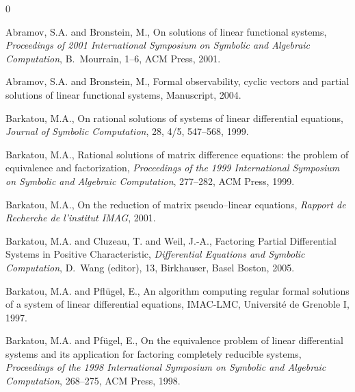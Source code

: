 \begin{thebibliography}{0}


     Abramov, S.A. and Bronstein, M., On solutions of linear functional systems,
     {\em Proceedings of 2001 International Symposium on Symbolic and Algebraic Computation}, B.~Mourrain,
     1--6, ACM Press, 2001.

Abramov, S.A. and Bronstein, M., Formal observability, cyclic
vectors and partial solutions of linear functional systems,
Manuscript, 2004.



Barkatou, M.A., On rational solutions of systems of linear
differential equations, {\em Journal of Symbolic Computation}, 28,
4/5, 547--568, 1999.

Barkatou, M.A., Rational solutions of matrix difference equations:
the problem of equivalence and factorization, {\em Proceedings of
the 1999 International Symposium on Symbolic and Algebraic
Computation}, 277--282, ACM Press, 1999.

Barkatou, M.A., On the reduction of matrix pseudo--linear
equations, {\em Rapport de Recherche de l'institut IMAG}, 2001.

Barkatou, M.A.  and Cluzeau, T. and Weil, J.-A., Factoring Partial
Differential Systems in Positive Characteristic, {\em Differential
Equations and Symbolic Computation}, D.~Wang (editor), 13,
Birkhauser, Basel Boston, 2005.






Barkatou, M.A. and Pfl{\"u}gel, E., An algorithm computing regular
formal solutions of a system of linear differential equations,
IMAC-LMC, Universit\'e de Grenoble I, 1997.



Barkatou, M.A. and Pf{\"u}gel, E., On the equivalence problem of
linear differential systems and its application for factoring
           completely reducible systems, {\em Proceedings of the 1998
           International Symposium on Symbolic and Algebraic Computation}, 268--275,
ACM Press, 1998.



\end{thebibliography}
